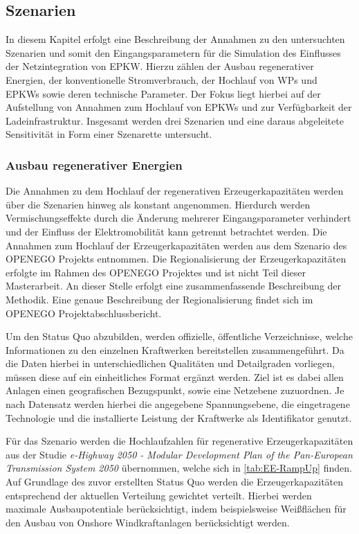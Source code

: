 \subsection{Szenarien}

In diesem Kapitel erfolgt eine Beschreibung der Annahmen zu den untersuchten Szenarien und somit den Eingangsparametern für die Simulation des Einflusses der Netzintegration von \gls{EPKW}.
Hierzu zählen der Ausbau regenerativer Energien, der konventionelle Stromverbrauch, der Hochlauf von \glspl{WP} und \glspl{EPKW} sowie deren technische Parameter.
Der Fokus liegt hierbei auf der Aufstellung von Annahmen zum Hochlauf von \glspl{EPKW} und zur Verfügbarkeit der Ladeinfrastruktur.
Insgesamt werden drei Szenarien und eine daraus abgeleitete Sensitivität in Form einer Szenarette untersucht.


\subsubsection{Ausbau regenerativer Energien}

Die Annahmen zu dem Hochlauf der regenerativen Erzeugerkapazitäten werden über die Szenarien hinweg als konstant angenommen.
Hierdurch werden Vermischungseffekte durch die Änderung mehrerer Eingangsparameter verhindert und der Einfluss der Elektromobilität kann getrennt betrachtet werden.
Die Annahmen zum Hochlauf der Erzeugerkapazitäten werden aus dem Szenario \ego des \gls{OPENEGO} Projekts \cite{Mueller2019} entnommen.
Die Regionalisierung der Erzeugerkapazitäten erfolgte im Rahmen des \gls{OPENEGO} Projektes und ist nicht Teil dieser Masterarbeit.
An dieser Stelle erfolgt eine zusammenfassende Beschreibung der Methodik.
Eine genaue Beschreibung der Regionalisierung findet sich im \gls{OPENEGO} Projektabschlussbericht.\medskip

Um den Status Quo abzubilden, werden offizielle, öffentliche Verzeichnisse, welche Informationen zu den einzelnen Kraftwerken bereitstellen zusammengeführt.
Da die Daten hierbei in unterschiedlichen Qualitäten und Detailgraden vorliegen, müssen diese auf ein einheitliches Format ergänzt werden.
Ziel ist es dabei allen Anlagen einen geografischen Bezugspunkt, sowie eine Netzebene zuzuordnen.
Je nach Datensatz werden hierbei die angegebene Spannungsebene, die eingetragene Technologie und die installierte Leistung der Kraftwerke als Identifikator genutzt.\medskip

Für das Szenario \ego werden die Hochlaufzahlen für regenerative Erzeugerkapazitäten aus der Studie \textit{e-Highway 2050 - Modular Development Plan of the Pan-European Transmission System 2050} \cite{EEHPG2015} übernommen, welche sich in \autoref{tab:EE-RampUp} finden.
Auf Grundlage des zuvor erstellten Status Quo werden die Erzeugerkapazitäten entsprechend der aktuellen Verteilung gewichtet verteilt.
Hierbei werden maximale Ausbaupotentiale berücksichtigt, indem beispielsweise Weißflächen für den Ausbau von Onshore Windkraftanlagen berücksichtigt werden.

